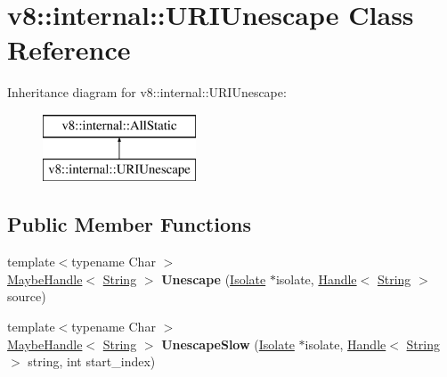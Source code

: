\hypertarget{classv8_1_1internal_1_1_u_r_i_unescape}{}\section{v8\+:\+:internal\+:\+:U\+R\+I\+Unescape Class Reference}
\label{classv8_1_1internal_1_1_u_r_i_unescape}
Inheritance diagram for v8\+:\+:internal\+:\+:U\+R\+I\+Unescape\+:\begin{figure}[H]
\begin{center}
\leavevmode
\includegraphics[height=2.000000cm]{classv8_1_1internal_1_1_u_r_i_unescape}
\end{center}
\end{figure}
\subsection*{Public Member Functions}
\begin{DoxyCompactItemize}
\item 
{\footnotesize template$<$typename Char $>$ }\\\hyperlink{classv8_1_1internal_1_1_maybe_handle}{Maybe\+Handle}$<$ \hyperlink{classv8_1_1internal_1_1_string}{String} $>$ {\bfseries Unescape} (\hyperlink{classv8_1_1internal_1_1_isolate}{Isolate} $\ast$isolate, \hyperlink{classv8_1_1internal_1_1_handle}{Handle}$<$ \hyperlink{classv8_1_1internal_1_1_string}{String} $>$ source)\hypertarget{classv8_1_1internal_1_1_u_r_i_unescape_a45c6c6f632e00cbfe3cb0cb1669acc0d}{}\label{classv8_1_1internal_1_1_u_r_i_unescape_a45c6c6f632e00cbfe3cb0cb1669acc0d}

\item 
{\footnotesize template$<$typename Char $>$ }\\\hyperlink{classv8_1_1internal_1_1_maybe_handle}{Maybe\+Handle}$<$ \hyperlink{classv8_1_1internal_1_1_string}{String} $>$ {\bfseries Unescape\+Slow} (\hyperlink{classv8_1_1internal_1_1_isolate}{Isolate} $\ast$isolate, \hyperlink{classv8_1_1internal_1_1_handle}{Handle}$<$ \hyperlink{classv8_1_1internal_1_1_string}{String} $>$ string, int start\+\_\+index)\hypertarget{classv8_1_1internal_1_1_u_r_i_unescape_a5a9dc1bfade32efa347b4c998fb3b07d}{}\label{classv8_1_1internal_1_1_u_r_i_unescape_a5a9dc1bfade32efa347b4c998fb3b07d}

\end{DoxyCompactItemize}
